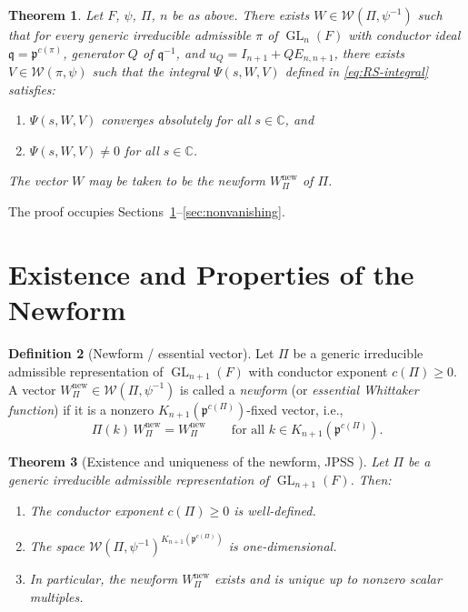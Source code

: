 \documentclass[12pt]{article}
\newtheorem{theorem}{Theorem}
\theoremstyle{definition}
\newtheorem{definition}[theorem]{Definition}
\DeclareMathOperator{\GL}{GL}
\begin{document}
\begin{theorem}
\label{thm:main}
Let $F$, $\psi$, $\Pi$, $n$ be as above.  There exists
$W \in \mathcal{W}(\Pi,\psi^{-1})$ such that for every generic irreducible
admissible $\pi$ of $\GL_n(F)$ with conductor ideal $\mathfrak{q} = \mathfrak{p}^{c(\pi)}$,
generator $Q$ of $\mathfrak{q}^{-1}$, and $u_Q = I_{n+1} + QE_{n,n+1}$,
there exists $V \in \mathcal{W}(\pi,\psi)$ such that
the integral $\Psi(s,W,V)$ defined in \eqref{eq:RS-integral} satisfies:
\begin{enumerate}
\item[(i)] $\Psi(s,W,V)$ converges absolutely for all $s \in \mathbb{C}$, and
\item[(ii)] $\Psi(s,W,V) \neq 0$ for all $s \in \mathbb{C}$.
\end{enumerate}
The vector $W$ may be taken to be the newform $W_\Pi^{\mathrm{new}}$ of $\Pi$.
\end{theorem}

The proof occupies Sections~\ref{sec:newform}--\ref{sec:nonvanishing}.

\section{Existence and Properties of the Newform}
\label{sec:newform}

\begin{definition}[Newform / essential vector]
\label{def:newform}
Let $\Pi$ be a generic irreducible admissible representation of $\GL_{n+1}(F)$
with conductor exponent $c(\Pi) \geq 0$.  A vector $W_\Pi^{\mathrm{new}} \in
\mathcal{W}(\Pi,\psi^{-1})$ is called a \emph{newform} (or \emph{essential
Whittaker function}) if it is a nonzero $K_{n+1}(\mathfrak{p}^{c(\Pi)})$-fixed
vector, i.e.,
\[
  \Pi(k)\,W_\Pi^{\mathrm{new}} = W_\Pi^{\mathrm{new}}
  \qquad \text{for all } k \in K_{n+1}(\mathfrak{p}^{c(\Pi)}).
\]
\end{definition}

\begin{theorem}[Existence and uniqueness of the newform, JPSS \cite{JPSS81}]
\label{thm:newform-exists}
Let $\Pi$ be a generic irreducible admissible representation of $\GL_{n+1}(F)$.
Then:
\begin{enumerate}
\item[(a)] The conductor exponent $c(\Pi) \geq 0$ is well-defined.
\item[(b)] The space $\mathcal{W}(\Pi,\psi^{-1})^{K_{n+1}(\mathfrak{p}^{c(\Pi)})}$
  is one-dimensional.
\item[(c)] In particular, the newform $W_\Pi^{\mathrm{new}}$ exists and is unique
  up to nonzero scalar multiples.
\end{enumerate}
\end{theorem}
\end{document}
